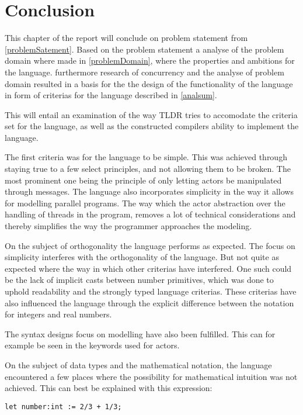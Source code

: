 \chapter{Conclusion}


This chapter of the report will conclude on problem statement from \cref{problemSatement}. Based on the problem statement a analyse of the problem domain where made in \cref{problemDomain}, where the properties and ambitions for the language. furthermore research of concurrency and the analyse of problem domain resulted in a basis for the the design of the functionality of the language in form of criterias for the language described in \cref{analsum}.

This will entail an examination of the way TLDR tries to accomodate the criteria set for the language, as well as the constructed compilers ability to implement the language.

The first criteria was for the language to be simple. This was achieved through staying true to a few select principles, and not allowing them to be broken. The most prominent one being the principle of only letting actors be manipulated through messages. The language also incorporates simplicity in the way it allows for modelling parallel programs. The way which the actor abstraction over the handling of threads in the program, removes a lot of technical considerations and thereby simplifies the way the programmer approaches the modeling.
 
On the subject of orthogonality the language performs as expected. The focus on simplicity interferes with the orthogonality of the language. But not quite as expected where the way in which other criterias have interfered. One such could be the lack of implicit casts between number primitives, which was done to uphold readability and the strongly typed language criterias. These criterias have also influenced the language through the explicit difference between the notation for integers and real numbers.

The syntax designs focus on modelling have also been fulfilled. This can for example be seen in the keywords used for actors.

On the subject of data types and the mathematical notation, the language encountered a few places where the possibility for mathematical intuition was not achieved. This can best be explained with this expression:

\begin{lstlisting}
let number:int := 2/3 + 1/3;
\end{lstlisting}

